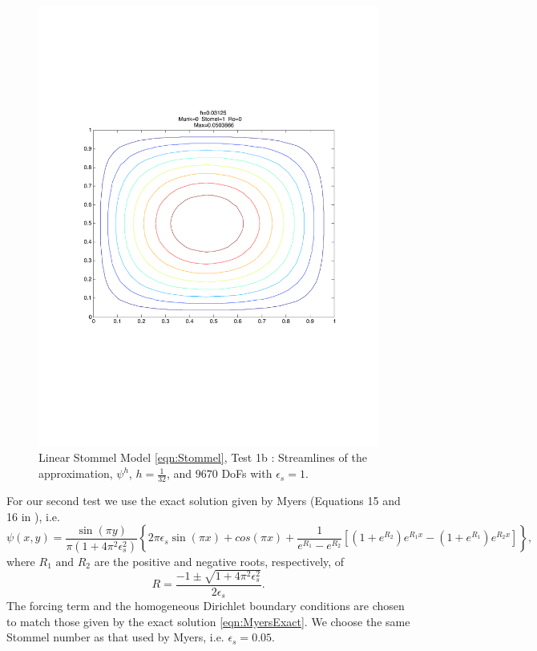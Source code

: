 \begin{figure}%
  \begin{center}
    \includegraphics[scale=0.5]{Figures/StommelVallise1.pdf}
    \caption{Linear Stommel Model \eqref{eqn:Stommel}, Test 1b \cite{Vallis06}: Streamlines of the approximation,
    $\psi^h$, $h=\frac{1}{32}$, and $9670$ DoFs with $\epsilon_s=1$.}
    \label{fig:StommelVallise1}
  \end{center}
\end{figure}

For our second test we use the exact solution given by Myers (Equations 15 and
16 in \cite{Myers}), i.e.
{\footnotesize
\begin{equation}
  \psi(x,y) =\frac{\sin(\pi y)}{\pi(1+4\pi^2\epsilon_s^2)}\left\{2\pi\epsilon_s\sin(\pi x)+cos(\pi x)+\frac{1}{e^{R_1}-e^{R_2}}\left[(1+e^{R_2})e^{R_1x}-(1+e^{R_1})e^{R_2x}\right]\right\},
  \label{eqn:MyersExact}
\end{equation}
}
where $R_1\text{ and } R_2$ are the positive and negative roots, respectively,
of
\begin{equation*}
  R = \frac{-1\pm\sqrt{1+4\pi^2 \epsilon_s^2}}{2\epsilon_s}.
\end{equation*}
The forcing term and the homogeneous Dirichlet boundary conditions are chosen to
match those given by the exact solution \eqref{eqn:MyersExact}. We choose the
same Stommel number as that used by Myers, i.e. $\epsilon_s=0.05$.

